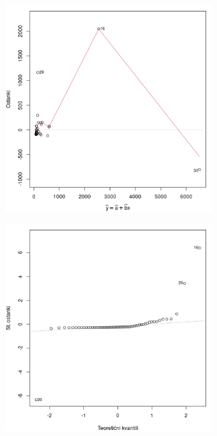 \begin{figure}[h]
    \centering
    \begin{subfigure}[ht]{0.49\textwidth}
        \includegraphics[width=1\textwidth]{res/netrans-linearnost-modela.png}
        \label{img:netrans-linearnost-modela}
    \end{subfigure}
    \hfill
    \begin{subfigure}[ht]{0.49\textwidth}
        \includegraphics[width=1\textwidth]{res/netrans-normalnost-porazdelitve.png}
        \label{img:netrans-normalnost-porazdelitve}
    \end{subfigure}


\end{figure}
